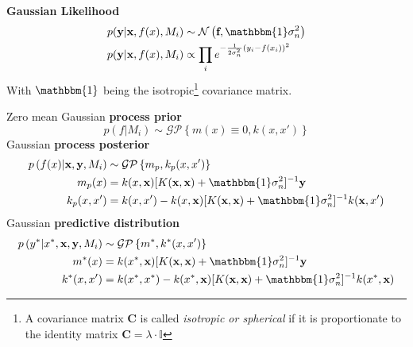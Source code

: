 \documentclass[11pt]{article}
\theoremstyle{definition}
\newcommand*\N[1]{\mathcal{N}\left(#1\right)}
\newcommand*\GP[1]{\mathcal{GP}\left\{#1\right\}}
\newcommand*\isocov{\ensuremath{\mathbbm{1}}}
\begin{document}
\noindent
\textbf{Gaussian Likelihood}
\begin{align*}
p(\textbf{y}|\textbf{x}, f(x), M_i) &\sim \N{\textbf{f}, \isocov\sigma_n^2}\\
p(\textbf{y}|\textbf{x}, f(x), M_i) &\propto \prod_i e^{-\frac{1}{2\sigma_n^2}\left(y_i -f(x_i)\right)^2}
\end{align*}
With $\isocov$ being the isotropic\footnote{A covariance matrix $\textbf{C}$ is called \emph{isotropic or spherical} if it is proportionate to the identity matrix $\textbf{C} = \lambda\cdot\mathbb{I}$} covariance matrix.

\vspace{1em}
\noindent
Zero mean Gaussian \textbf{process prior}
\begin{equation*}
p(f|M_i) \sim \GP{m(x) \equiv 0, k(x,x')}
\end{equation*}
Gaussian \textbf{process posterior}
\begin{align*}
	p\left( f(x) \middle| \textbf{x},\textbf{y}, M_i \right) &\sim \GP{m_p, k_p(x,x')}\\
	m_p(x) &= k(x,\textbf{x})[K(\textbf{x},\textbf{x}) + \isocov\sigma_n^2]^{-1}\textbf{y}\\
	k_p(x,x') &= k(x,x') - k(x,\textbf{x})[K(\textbf{x},\textbf{x}) + \isocov\sigma_n^2]^{-1} k(\textbf{x},x')
\end{align*}
Gaussian \textbf{predictive distribution}
\begin{align*}
	p\left( y^* \middle| x^*, \textbf{x},\textbf{y}, M_i \right) &\sim \GP{m^*, k^*(x,x')}\\
	m^*(x) &= k(x^*,\textbf{x})[K(\textbf{x},\textbf{x}) + \isocov\sigma_n^2]^{-1}\textbf{y}\\
	k^*(x,x') &= k(x^*,x^*) - k(x^*,\textbf{x})[K(\textbf{x},\textbf{x}) + \isocov\sigma_n^2]^{-1} k(x^*,\textbf{x})
\end{align*}
\end{document}
